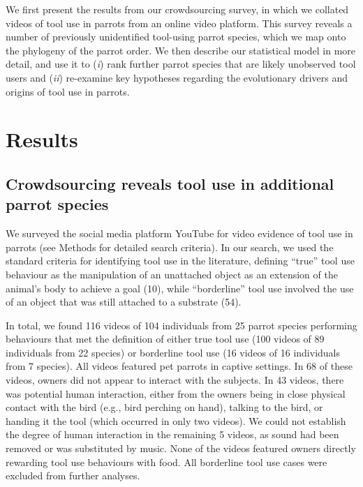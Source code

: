 \documentclass[
  man, donotrepeattitle,floatsintext]{apa6}
\begin{document}
We first present the results from our crowdsourcing survey, in which we collated
videos of tool use in parrots from an online video platform. This survey reveals
a number of previously unidentified tool-using parrot species, which we map onto
the phylogeny of the parrot order. We then describe our statistical model in
more detail, and use it to (\emph{i}) rank further parrot species that are likely
unobserved tool users and (\emph{ii}) re-examine key hypotheses regarding the
evolutionary drivers and origins of tool use in parrots.

\hypertarget{results}{%
\section{Results}\label{results}}

\hypertarget{crowdsourcing-reveals-tool-use-in-additional-parrot-species}{%
\subsection{Crowdsourcing reveals tool use in additional parrot species}\label{crowdsourcing-reveals-tool-use-in-additional-parrot-species}}

We surveyed the social media platform YouTube for video evidence of tool use in
parrots (see Methods for detailed search criteria). In our search, we used the
standard criteria for identifying tool use in the literature, defining ``true''
tool use behaviour as the manipulation of an unattached object as an extension
of the animal's body to achieve a goal (10), while ``borderline'' tool
use involved the use of an object that was still attached to a substrate
(54).

In total, we found 116 videos of
104 individuals from
25
parrot species performing behaviours that met the definition of either true tool
use (100 videos of
89
individuals from
22
species) or borderline tool use (16 videos of
16
individuals from
7
species). All videos featured pet parrots in captive settings. In
68 of these
videos, owners did not appear to interact with the subjects. In
43 videos,
there was potential human interaction, either from the owners being in close physical
contact with the bird (e.g., bird perching on hand), talking to the bird, or
handing it the tool (which occurred in only two videos). We could not establish
the degree of human interaction in the remaining
5
videos, as sound had been removed or was substituted by music. None of the
videos featured owners directly rewarding tool use behaviours with food. All
borderline tool use cases were excluded from further analyses.
\end{document}
